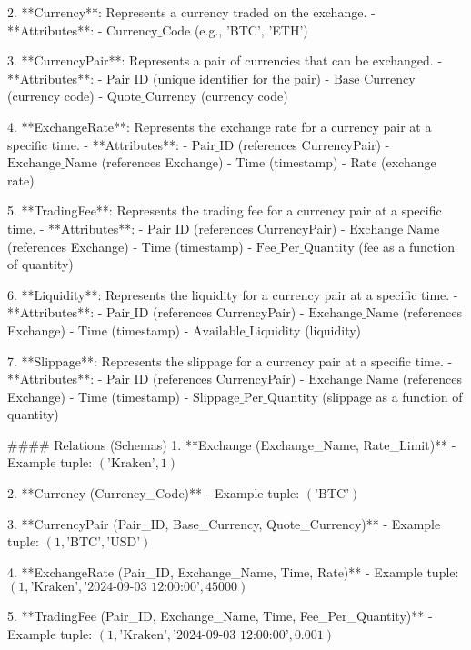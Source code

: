 2. **Currency**: Represents a currency traded on the exchange.
   - **Attributes**:
     - \( \text{Currency\_Code} \) (e.g., 'BTC', 'ETH')

3. **CurrencyPair**: Represents a pair of currencies that can be exchanged.
   - **Attributes**:
     - \( \text{Pair\_ID} \) (unique identifier for the pair)
     - \( \text{Base\_Currency} \) (currency code)
     - \( \text{Quote\_Currency} \) (currency code)

4. **ExchangeRate**: Represents the exchange rate for a currency pair at a specific time.
   - **Attributes**:
     - \( \text{Pair\_ID} \) (references CurrencyPair)
     - \( \text{Exchange\_Name} \) (references Exchange)
     - \( \text{Time} \) (timestamp)
     - \( \text{Rate} \) (exchange rate)

5. **TradingFee**: Represents the trading fee for a currency pair at a specific time.
   - **Attributes**:
     - \( \text{Pair\_ID} \) (references CurrencyPair)
     - \( \text{Exchange\_Name} \) (references Exchange)
     - \( \text{Time} \) (timestamp)
     - \( \text{Fee\_Per\_Quantity} \) (fee as a function of quantity)

6. **Liquidity**: Represents the liquidity for a currency pair at a specific time.
   - **Attributes**:
     - \( \text{Pair\_ID} \) (references CurrencyPair)
     - \( \text{Exchange\_Name} \) (references Exchange)
     - \( \text{Time} \) (timestamp)
     - \( \text{Available\_Liquidity} \) (liquidity)

7. **Slippage**: Represents the slippage for a currency pair at a specific time.
   - **Attributes**:
     - \( \text{Pair\_ID} \) (references CurrencyPair)
     - \( \text{Exchange\_Name} \) (references Exchange)
     - \( \text{Time} \) (timestamp)
     - \( \text{Slippage\_Per\_Quantity} \) (slippage as a function of quantity)

#### Relations (Schemas)
1. **Exchange (Exchange\_Name, Rate\_Limit)**
   - Example tuple: \( (\text{'Kraken'}, 1) \)

2. **Currency (Currency\_Code)**
   - Example tuple: \( (\text{'BTC'}) \)

3. **CurrencyPair (Pair\_ID, Base\_Currency, Quote\_Currency)**
   - Example tuple: \( (1, \text{'BTC'}, \text{'USD'}) \)

4. **ExchangeRate (Pair\_ID, Exchange\_Name, Time, Rate)**
   - Example tuple: \( (1, \text{'Kraken'}, \text{'2024-09-03 12:00:00'}, 45000) \)

5. **TradingFee (Pair\_ID, Exchange\_Name, Time, Fee\_Per\_Quantity)**
   - Example tuple: \( (1, \text{'Kraken'}, \text{'2024-09-03 12:00:00'}, 0.001) \)

